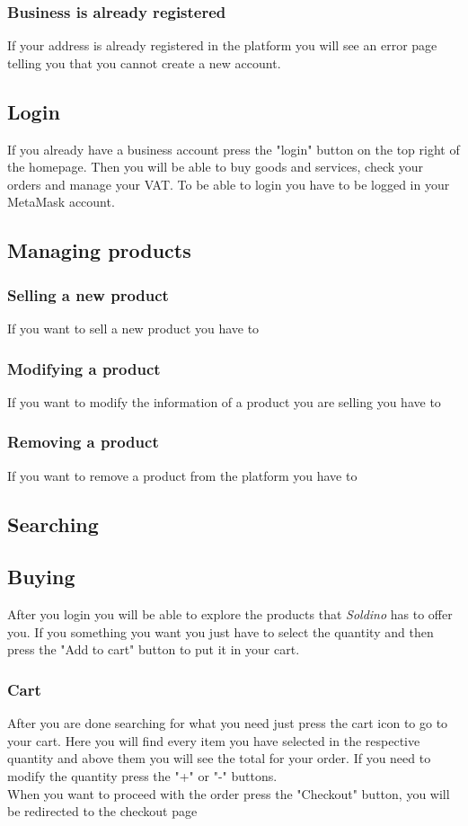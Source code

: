 	\subsubsection{Business is already registered}
	If your address is already registered in the platform you will see an
	error page telling you that you cannot create a new account.
	\subsection{Login}
	If you already have a business account press the "login" button on the 
	top right of the homepage. Then you will be able to buy goods and services, 
	check your orders and manage your VAT. To be able to login you have to be 
	logged in your MetaMask account.
	\subsection{Managing products}
	\subsubsection{Selling a new product}
	If you want to sell a new product you have to
	
	\subsubsection{Modifying a product}
	If you want to modify the information of a product you are selling you 
	have to 
	\subsubsection{Removing a product}
	If you want to remove a product from the platform you have to
	
	\subsection{Searching}
	\subsection{Buying}
	After you login you will be able to explore the products that 
	\textit{Soldino} has to offer you. If you something you want you
	just have to select the quantity and then press the "Add to cart" button 
	to put it in your cart.
	\subsubsection{Cart}
	After you are done searching for what you need just press the cart icon to
	go to your cart. Here you will find every item you have selected in the 
	respective quantity and above them you will see the total for your order.
	If you need to modify the quantity press the "+" or "-" buttons. \\
	When you want to proceed with the order press the "Checkout" button, 
	you will be redirected to the checkout page
